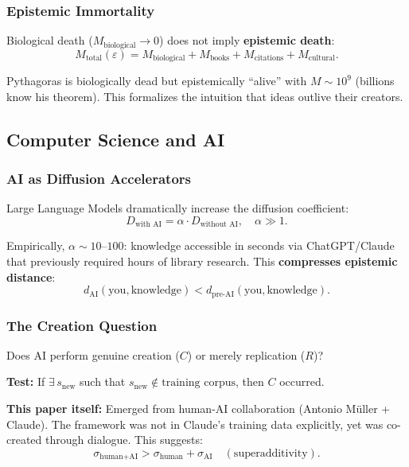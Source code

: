 \documentclass[12pt]{article}
\begin{document}
\subsubsection{Epistemic Immortality}

Biological death ($M_{\text{biological}} \to 0$) does not imply \textbf{epistemic death}:
\begin{equation}
    M_{\text{total}}(\varepsilon) = M_{\text{biological}} + M_{\text{books}} + M_{\text{citations}} + M_{\text{cultural}}.
\end{equation}

Pythagoras is biologically dead but epistemically ``alive'' with $M \sim 10^9$ (billions know his theorem). This formalizes the intuition that ideas outlive their creators.

\subsection{Computer Science and AI}

\subsubsection{AI as Diffusion Accelerators}

Large Language Models dramatically increase the diffusion coefficient:
\begin{equation}
    D_{\text{with AI}} = \alpha \cdot D_{\text{without AI}}, \quad \alpha \gg 1.
\end{equation}

Empirically, $\alpha \sim 10$--$100$: knowledge accessible in seconds via ChatGPT/Claude that previously required hours of library research. This \textbf{compresses epistemic distance}:
\begin{equation}
    d_{\text{AI}}(\text{you}, \text{knowledge}) < d_{\text{pre-AI}}(\text{you}, \text{knowledge}).
\end{equation}

\subsubsection{The Creation Question}

Does AI perform genuine creation ($C$) or merely replication ($R$)?

\textbf{Test:} If $\exists\, s_{\text{new}}$ such that $s_{\text{new}} \notin \text{training corpus}$, then $C$ occurred.

\textbf{This paper itself:} Emerged from human-AI collaboration (Antonio Müller + Claude). The framework was not in Claude's training data explicitly, yet was co-created through dialogue. This suggests:
\begin{equation}
    \sigma_{\text{human+AI}} > \sigma_{\text{human}} + \sigma_{\text{AI}} \quad (\text{superadditivity}).
\end{equation}
\end{document}
